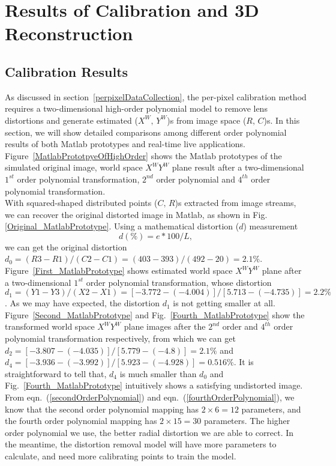 \chapter{Results of Calibration and 3D Reconstruction} %
\label{chapterCaliResultsReconstruction} %
\section{Calibration Results}
\label{sectionPrototypeTwoDtransformation} 
As discussed in section~\ref{perpixelDataCollection}, the per-pixel calibration method requires a two-dimensional high-order polynomial model to remove lens distortions and generate estimated (\(X^W,\, Y^W\))s from image space (\(R, \, C\))s. In this section, we will show detailed comparisons among different order polynomial results of both Matlab prototypes and real-time live applications. Figure~\ref{MatlabPrototpyeOfHighOrder} shows the Matlab prototypes of the simulated original image, world space \(X^WY^W\) plane result after a two-dimensional \(1^{st}\) order polynomial transformation, \(2^{nd}\) order polynomial and \(4^{th}\) order polynomial transformation. %
%
\\\indent
With squared-shaped distributed points (\(C,\, R\))s extracted from image streams, we can recover the original distorted image in Matlab, as shown in Fig.\ref{Original_MatlabPrototype}. Using a mathematical distortion (\(d\)) measurement \cite{distortionMeasurement_2012}
%
\begin{equation}
d (\%)=  e*100/L ,
\label{mathematicalDistortion}
\end{equation}%
%
\noindent
we can get the original distortion \(d_0 = (R3 - R1) / (C2 -C1) = (403 - 393) / (492 - 20) = 2.1\%\). Figure~\ref{First_MatlabPrototype} shows estimated world space \(X^WY^W\) plane after a two-dimensional \(1^{st}\) order polynomial transformation, whose distortion \(d_1 = (Y1 - Y3) / (X2 -X1) = [-3.772 - (-4.004)] / [5.713 - (-4.735)] = 2.2\%\). As we may have expected, the distortion \(d_1\) is not getting smaller at all. Figure~\ref{Second_MatlabPrototype} and Fig.~\ref{Fourth_MatlabPrototype} show the transformed world space \(X^WY^W\) plane images after the \(2^{nd}\) order and \(4^{th}\) order polynomial transformation respectively, from which we can get \(d_2 = [-3.807 - (-4.035)] / [5.779 - (-4.8)] = 2.1\%\) and \(d_4 = [-3.936 - (-3.992)] / [5.923 - (-4.928)] = 0.516\%\). It is straightforward to tell that, \(d_4\) is much smaller than \(d_0\) and Fig.~\ref{Fourth_MatlabPrototype} intuitively shows a satisfying undistorted image. From eqn.~(\ref{secondOrderPolynomial}) and eqn.~(\ref{fourthOrderPolynomial}), we know that the second order polynomial mapping has $2\times6=12$ parameters, and the fourth order polynomial mapping has $2\times15=30$ parameters. The higher order polynomial we use, the better radial distortion we are able to correct. In the meantime, the distortion removal model will have more parameters to calculate, and need more calibrating points to train the model.%

